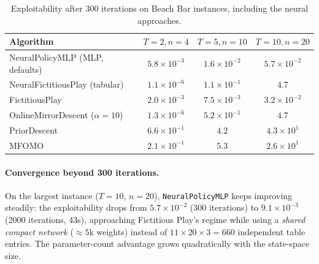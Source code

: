 \documentclass[11pt,a4paper]{article}
\begin{document}
\begin{table}[h]
\centering\small
\caption{Exploitability after 300 iterations on Beach Bar instances,
including the neural approaches.}\label{tab:mlp-bench}
\begin{tabular}{lccc}
\toprule
Algorithm & $T{=}2, n{=}4$ & $T{=}5, n{=}10$ & $T{=}10, n{=}20$ \\
\midrule
NeuralPolicyMLP (MLP, defaults)   & $5.8 \times 10^{-3}$ & $1.6 \times 10^{-2}$ & $5.7 \times 10^{-2}$ \\
NeuralFictitiousPlay (tabular)   & $1.1 \times 10^{-6}$ & $1.1 \times 10^{-1}$ & $4.7$ \\
FictitiousPlay                     & $2.0 \times 10^{-3}$ & $7.5 \times 10^{-3}$ & $3.2 \times 10^{-2}$ \\
OnlineMirrorDescent ($\alpha{=}10$) & $1.3 \times 10^{-6}$ & $5.2 \times 10^{-1}$ & $4.7$ \\
PriorDescent                       & $6.6 \times 10^{-1}$ & $4.2$ & $4.3 \times 10^{1}$ \\
MFOMO                              & $2.1 \times 10^{-1}$ & $5.3$ & $2.6 \times 10^{1}$ \\
\bottomrule
\end{tabular}
\end{table}

\paragraph{Convergence beyond 300 iterations.} On the largest instance
($T{=}10$, $n{=}20$), \texttt{NeuralPolicyMLP} keeps improving steadily:
the exploitability drops from $5.7 \times 10^{-2}$ (300 iterations) to
$9.1 \times 10^{-3}$ (2000 iterations, 43s), approaching Fictitious Play's
regime while using a \emph{shared compact network} ($\approx 5$k weights)
instead of $11 \times 20 \times 3 = 660$ independent table entries. The
parameter-count advantage grows quadratically with the state-space size.
\end{document}
